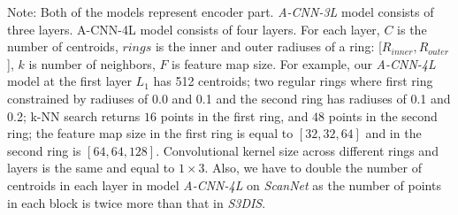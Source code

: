 \documentclass[10pt,twocolumn,letterpaper]{article}
\begin{document}
\begin{table*}[t]
\begin{tablenotes}
\footnotesize \item Note: Both of the models represent encoder part. \emph{A-CNN-3L} model consists of three layers. A-CNN-4L model consists of four layers. For each layer, $C$ is the number of centroids, $rings$ is the inner and outer radiuses of a ring: [$R_{inner}, R_{outer}$], $k$ is number of neighbors, $F$ is feature map size. For example, our \emph{A-CNN-4L} model at the first layer $L_1$ has 512 centroids; two regular rings where first ring constrained by radiuses of 0.0 and 0.1 and the second ring has radiuses of 0.1 and 0.2; k-NN search returns $16$ points in the first ring, and $48$ points in the second ring; the feature map size in the first ring is equal to $[32,32,64]$ and in the second ring is $[64,64,128]$. Convolutional kernel size across different rings and layers is the same and equal to $1\times3$. Also, we have to double the number of centroids in each layer in model \emph{A-CNN-4L} on \emph{ScanNet} as the number of points in each block is twice more than that in \emph{S3DIS}.\vspace{-2mm}
 \end{tablenotes}
 \label{table:network_configs}
\end{table*}

\vspace{-1mm}
\end{document}
